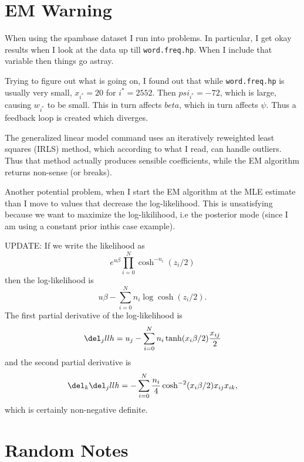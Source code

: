 \documentclass{article}
\begin{document}

\section{EM Warning}

When using the spambase dataset I run into problems.  In particular, I get okay
results when I look at the data up till \texttt{word.freq.hp}.  When I include
that variable then things go astray.

Trying to figure out what is going on, I found out that while
\texttt{word.freq.hp} is usually very small, $x_{i^*} = 20$ for $i^*=2552$.
Then $psi_{i^*} = -72$, which is large, causing $w_{i^*}$ to be small.  This in
turn affects $beta$, which in turn affects $\psi$.  Thus a feedback loop is
created which diverges.

The generalized linear model command uses an iteratively reweighted least
squares (IRLS) method, which according to what I read, can handle outliers.
Thus that method actually produces sensible coefficients, while the EM algorithm
returns non-sense (or breaks).

Another potential problem, when I start the EM algorithm at the MLE estimate
than I move to values that decrease the log-likelihood.  This is unsatisfying
because we want to maximize the log-likilihood, i.e the posterior mode (since I
am using a constant prior inthis case example).

UPDATE: If we write the likelihood as
\[
e^{u\beta} \prod_{i=0}^N \cosh^{-n_i}(z_i/2)
\]
then the log-likelihood is
\[
u \beta - \sum_{i=0}^N n_i \log \cosh (z_i/2).
\]
The first partial derivative of the log-likelihood is
\[
\del_j llh = u_j - \sum_{i=0}^N n_i \tanh(x_i \beta/2) \frac{x_{ij}}{2}
\]
and the second partial derivative is
\[
\del_k \del_j llh = - \sum_{i=0}^N \frac{n_i}{4} \cosh^{-2}(x_i \beta/2) x_{ij} x_{ik},
\]
which is certainly non-negative definite.

\section{Random Notes}
\end{document}
